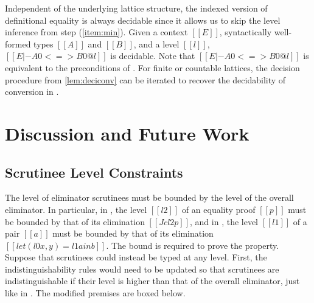 \documentclass[acmsmall]{acmart}
\theoremstyle{linked}
\newenvironment{linkthm}[1]
  {\def\thislink{#1}\innlinkthm}
  {\endinnlinkthm}
\theoremstyle{deflinked}
\theoremstyle{acmdefinition}
\newcommand{\sw}[1]{}
\begin{document}
Independent of the underlying lattice structure, the
indexed version of definitional equality is always decidable since it
allows us to skip the level inference from step (\ref{item:min}).
\begin{linkthm}{https://yiyunliu.github.io/dcoi/DCOIOmega.iconv_dec.html\#iconv_dec.iconv_dec}[Decidability of indexed type conversion]
  \label{lem:deciconv}
  Given a context $[[E]]$, syntactically well-formed types $[[A]]$ and
  $[[B]]$, and a level $[[l]]$, $[[E |- A0 <=> B0 @ l]]$ is decidable.
\end{linkthm}
Note that $[[E |- A0 <=> B0 @ l]]$ is equivalent to the preconditions of .
For finite or countable lattices, the decision procedure from
\cref{lem:deciconv} can be iterated to recover the decidability
of conversion in .

\section{Discussion and Future Work}

\subsection{Scrutinee Level Constraints} \label{sec:scrutinee-level}
\sw{I wish this section talked a little more about strictness. If we had a CBV application,
then I guess we would need to have a scrutinee constraint in application. OTOH, if we have
a lazy let term, we would not need this constraint.}

The level of eliminator scrutinees must be bounded by the level of the overall eliminator.
In particular, in , the level $[[l2]]$ of an equality proof $[[p]]$
must be bounded by that of its elimination $[[J c l2 p]]$,
and in , the level $[[l1]]$ of a pair $[[a]]$
must be bounded by that of its elimination $[[let (l0 x, y) = l1 a in b]]$.
The bound is required to prove the  property.
Suppose that scrutinees could instead be typed at any level.
First, the indistinguishability rules would need to be updated
so that scrutinees are indistinguishable if their level is higher
than that of the overall eliminator, just like in .
The modified premises are boxed below.
%
\end{document}
